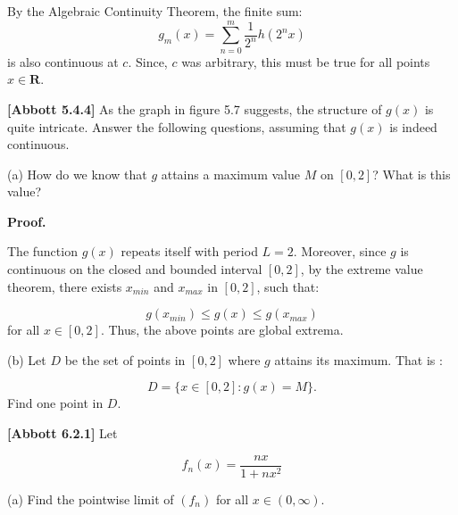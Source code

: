 \documentclass[10pt]{article}
\begin{document}
By the Algebraic Continuity Theorem, the finite sum:
\begin{equation*}
g_{m}( x) =\sum _{n=0}^{m}\frac{1}{2^{n}} h\left( 2^{n} x\right)
\end{equation*}
is also continuous at $\displaystyle c$. Since, $\displaystyle c$ was arbitrary, this must be true for all points $\displaystyle x\in \mathbf{R}$.



\textbf{[Abbott 5.4.4] }As the graph in figure 5.7 suggests, the structure of $\displaystyle g( x)$ is quite intricate. Answer the following questions, assuming that $\displaystyle g( x)$ is indeed continuous.



(a) How do we know that $\displaystyle g$ attains a maximum value $\displaystyle M$ on $\displaystyle [ 0,2]$? What is this value?



\textbf{Proof.}



The function $\displaystyle g( x)$ repeats itself with period $\displaystyle L=2$. Moreover, since $\displaystyle g$ is continuous on the closed and bounded interval $\displaystyle [ 0,2]$, by the extreme value theorem, there exists $\displaystyle x_{min}$ and $\displaystyle x_{max}$ in $\displaystyle [ 0,2]$, such that:


\begin{equation*}
g( x_{min}) \leq g( x) \leq g( x_{max})
\end{equation*}
for all $\displaystyle x\in [ 0,2]$. Thus, the above points are global extrema.







(b) Let $\displaystyle D$ be the set of points in $\displaystyle [ 0,2]$ where $\displaystyle g$ attains its maximum. That is :


\begin{equation*}
D=\{x\in [ 0,2] :g( x) =M\} .
\end{equation*}
Find one point in $\displaystyle D$.



\textbf{[Abbott 6.2.1]} Let 


\begin{equation*}
f_{n}( x) =\frac{nx}{1+nx^{2}}
\end{equation*}


(a) Find the pointwise limit of $\displaystyle ( f_{n})$ for all $\displaystyle x\in ( 0,\infty )$.
\end{document}
